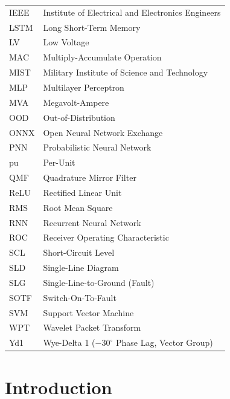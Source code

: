 \documentclass[12pt,a4paper,oneside]{report}
\begin{document}
\begin{longtable}{p{2.5cm} p{11.5cm}}
IEEE & Institute of Electrical and Electronics Engineers\\
LSTM & Long Short-Term Memory\\
LV & Low Voltage\\
MAC & Multiply-Accumulate Operation\\
MIST & Military Institute of Science and Technology\\
MLP & Multilayer Perceptron\\
MVA & Megavolt-Ampere\\
OOD & Out-of-Distribution\\
ONNX & Open Neural Network Exchange\\
PNN & Probabilistic Neural Network\\
pu & Per-Unit\\
QMF & Quadrature Mirror Filter\\
ReLU & Rectified Linear Unit\\
RMS & Root Mean Square\\
RNN & Recurrent Neural Network\\
ROC & Receiver Operating Characteristic\\
SCL & Short-Circuit Level\\
SLD & Single-Line Diagram\\
SLG & Single-Line-to-Ground (Fault)\\
SOTF & Switch-On-To-Fault\\
SVM & Support Vector Machine\\
WPT & Wavelet Packet Transform\\
Yd1 & Wye-Delta 1 ($-30^\circ$ Phase Lag, Vector Group)\\
\bottomrule
\end{longtable}

\clearpage
{}\setcounter{page}{1}

\chapter{Introduction}
\end{document}

